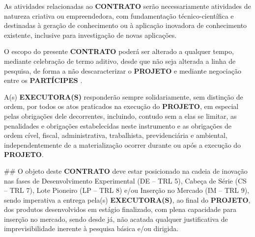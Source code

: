 

\xx As atividades relacionadas ao \textbf{CONTRATO} serão necessariamente atividades de natureza criativa ou empreendedora, com fundamentação técnico-científica e destinadas à geração de conhecimento ou à aplicação inovadora de conhecimento existente, inclusive para investigação de novas aplicações.

\xx O escopo do presente \textbf{CONTRATO} poderá ser alterado a qualquer tempo, mediante celebração de termo aditivo, desde que não seja alterada a linha de pesquisa, de forma a não descaracterizar o \textbf{PROJETO} e mediante negociação entre os \textbf{PARTÍCIPES}    .

\xx A(s) \textbf{EXECUTORA(S)} responderão sempre solidariamente, sem distinção de ordem, por todos os atos praticados na execução do \textbf{PROJETO}, em especial pelas obrigações dele decorrentes, incluindo, contudo sem a elas se limitar, as penalidades e obrigações estabelecidas neste instrumento e as obrigações de ordem cível, fiscal, administrativa, trabalhista, previdenciária e ambiental, independentemente de a materialização ocorrer durante ou após a execução do \textbf{PROJETO}.

## O objeto deste \textbf{CONTRATO} deve estar posicionado na cadeia de inovação nas fases de Desenvolvimento Experimental (DE – TRL 5), Cabeça de Série (CS – TRL 7), Lote Pioneiro (LP – TRL 8) e/ou Inserção no Mercado (IM – TRL 9), sendo imperativa a entrega pela(s) \textbf{EXECUTORA(S)}, ao final do \textbf{PROJETO}, dos produtos desenvolvidos em estágio finalizado, com plena capacidade para inserção no mercado, sendo desde já, não acatada qualquer justificativa de imprevisibilidade inerente à pesquisa básica e/ou dirigida.
